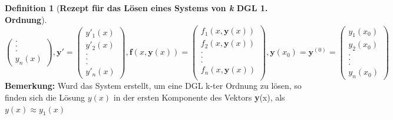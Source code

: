 \documentclass{article}
\theoremstyle{satz}
\theoremstyle{definition}
\newtheorem{definition}{Definition}
\begin{document}
\begin{tcolorbox}
\begin{definition}[\textbf{Rezept für das Lösen eines Systems von \textit{k} DGL 1. Ordnung}]
\begin{equation}
\begin{pmatrix}
.\\
.\\
.\\
y_n(x)
\end{pmatrix}, \textbf{y}' = \begin{pmatrix}
y'_1(x)\\
y'_2(x)\\
.\\
.\\
.\\
y'_n(x)
\end{pmatrix}, \textbf{f}(x,\textbf{y}(x)) = \begin{pmatrix}
f_1(x,\textbf{y}(x))\\
f_2(x,\textbf{y}(x))\\
.\\
.\\
.\\
f_n(x,\textbf{y}(x))\\
\end{pmatrix}, \textbf{y}(x_0) = \textbf{y}^{(0)} = \begin{pmatrix}
y_1(x_0)\\
y_2(x_0)\\
.\\
.\\
.\\
y_n(x_0)
\end{pmatrix}
\end{equation}
\textbf{Bemerkung:} Wurd das System erstellt, um eine DGL k-ter Ordnung zu lösen, so finden sich die Lösung $y(x)$ in der ersten Komponente des Vektors \textbf{y}(x), als $y(x) \approx y_1(x)$
\end{definition}
\end{tcolorbox}
\end{document}
